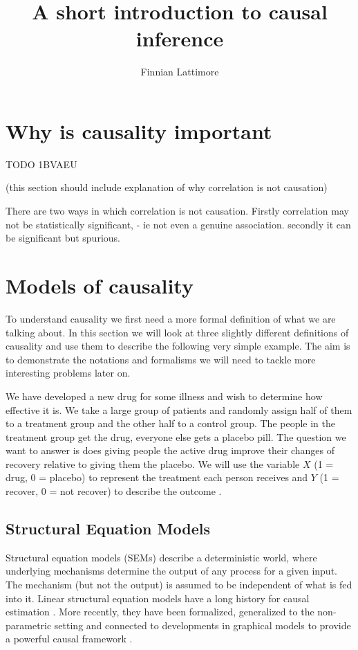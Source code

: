 \documentclass[11pt,a4paper]{article}
\author{Finnian Lattimore}
\title{A short introduction to causal inference}
\begin{document}
\def\ci{\perp\!\!\!\perp} %
\newtheorem{theorem}{Theorem}[section]
\newtheorem{definition}{Definition}[section]


\section{Why is causality important}

TODO
1BVAEU

(this section should include explanation of why correlation is not causation)

There are two ways in which correlation is not causation. Firstly correlation may not be statistically significant, - ie not even a genuine association. secondly it can be significant but spurious. 


\section{Models of causality}
\label{sec:causalmodels}
To understand causality we first need a more formal definition of what we are talking about. In this section we will look at three slightly different definitions of causality and use them to describe the following very simple example. The aim is to demonstrate the notations and formalisms we will need to tackle more interesting problems later on.

We have developed a new drug for some illness and wish to determine how effective it is. We take a large group of patients and randomly assign half of them to a treatment group and the other half to a control group. The people in the treatment group get the drug, everyone else gets a placebo pill. The question we want to answer is does giving people the active drug improve their changes of recovery relative to giving them the placebo. We will use the variable $X$ (1 = drug, 0 = placebo) to represent the treatment each person receives and $Y$ (1 = recover, 0 = not recover) to describe the outcome .
\subsection{Structural Equation Models}
\label{sec:SEM}
Structural equation models (SEMs) describe a deterministic world, where underlying mechanisms determine the output of any process for a given input. The mechanism (but not the output) is assumed to be independent of what is fed into it. Linear structural equation models have a long history for causal estimation \cite {Wright1921,Haavelmo1943}. More recently, they have been formalized, generalized to the non-parametric setting and connected to developments in graphical models to provide a powerful causal framework \cite{Pearl2000}.
\end{document}
